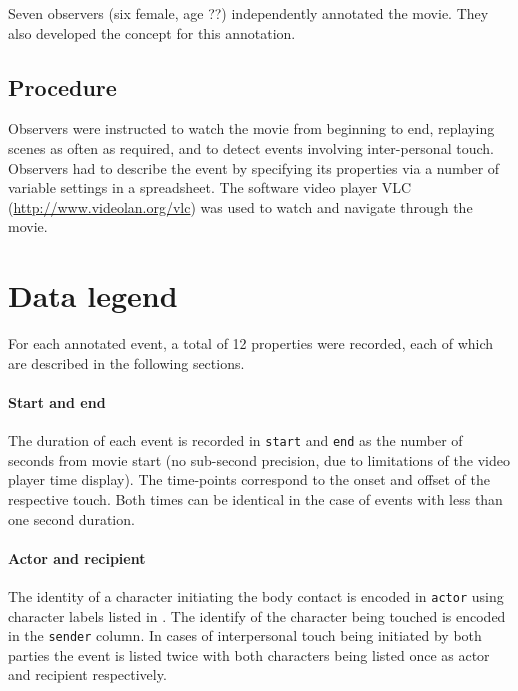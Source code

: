 \documentclass[10pt,a4paper]{article}
\begin{document}
Seven observers (six female, age ??) independently annotated the movie. They
also developed the concept for this annotation.

\subsection*{Procedure} %
Observers were instructed to watch the movie from beginning to end, replaying
scenes as often as required, and to detect events involving inter-personal touch.
Observers had to describe the event by specifying its
properties via a number of variable settings in a spreadsheet. The software
video player VLC (\url{http://www.videolan.org/vlc}) was used to watch and
navigate through the movie.


\section*{Data legend}

For each annotated event, a total of 12 properties were recorded, each of which
are described in the following sections.

\paragraph{Start and end} The duration of each event is recorded in
\texttt{start} and \texttt{end} as the number of seconds from movie start (no
sub-second precision, due to limitations of the video player time display). The
time-points correspond to the onset and offset of the respective touch. Both
times can be identical in the case of events with less than one second duration.

\paragraph{Actor and recipient} The identity of a character initiating the body 
contact is encoded in \texttt{actor} using character labels listed in \cite{LRS+2015}.
The identify of the character being touched is encoded in the \texttt{sender} column.
In cases of interpersonal touch being initiated by both parties the event is listed twice with both characters being listed once as actor and recipient respectively.
\end{document}
